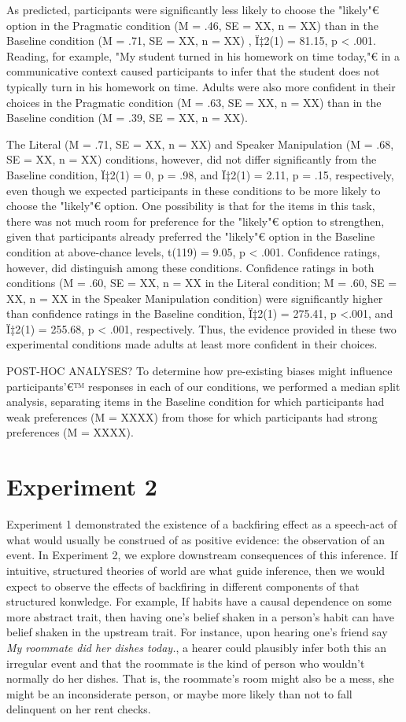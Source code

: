 \documentclass[10pt,letterpaper]{article}
\begin{document}
As predicted, participants were significantly less likely to choose the "likely"€ option in the Pragmatic condition (M = .46, SE = XX, n = XX) than in the Baseline condition (M = .71, SE = XX, n = XX) , Ï‡2(1) = 81.15, p < .001.  Reading, for example, "My student turned in his homework on time today,"€ in a communicative context caused participants to infer that the student does not typically turn in his homework on time.  Adults were also more confident in their choices in the Pragmatic condition (M = .63, SE = XX, n = XX) than in the Baseline condition (M = .39, SE = XX, n = XX).

The Literal (M = .71, SE = XX, n = XX) and Speaker Manipulation (M = .68,  SE = XX, n = XX) conditions, however, did not differ significantly from the Baseline condition, Ï‡2(1) = 0, p = .98, and Ï‡2(1) = 2.11, p = .15, respectively, even though we expected participants in these conditions to be more likely to choose the "likely"€ option.  One possibility is that for the items in this task, there was not much room for preference for the "likely"€ option to strengthen, given that participants already preferred the "likely"€ option in the Baseline condition at above-chance levels, t(119) = 9.05, p < .001.  Confidence ratings, however, did distinguish among these conditions.  Confidence ratings in both conditions (M = .60, SE = XX, n = XX in the Literal condition; M = .60, SE = XX, n = XX in the Speaker Manipulation condition) were significantly higher than confidence ratings in the Baseline condition,  Ï‡2(1) = 275.41, p <.001, and Ï‡2(1) = 255.68, p < .001, respectively.  Thus, the evidence provided in these two experimental conditions made adults at least more confident in their choices.  

POST-HOC ANALYSES?
To determine how pre-existing biases might influence participants'€™ responses in each of our conditions, we performed a median split analysis, separating items in the Baseline condition for which participants had weak preferences (M  = XXXX) from those for which participants had strong preferences (M = XXXX).  


\section{Experiment 2} 
Experiment 1 demonstrated the existence of a backfiring effect as a speech-act of what would usually be construed of as positive evidence: the observation of an event. 
In Experiment 2, we explore downstream consequences of this inference. 
If intuitive, structured theories of world are what guide inference, then we would expect to observe the effects of backfiring in different components of that structured konwledge.
For example, If habits have a causal dependence on some more abstract trait, then having one's belief shaken in a person's habit can have belief shaken in the upstream trait. 
For instance, upon hearing one's friend say \emph{My roommate did her dishes today.}, a hearer could plausibly infer both this an irregular event and that the roommate is the kind of person who wouldn't normally do her dishes. 
That is, the roommate's room might also be a mess, she might be an inconsiderate person, or maybe more likely than not to fall delinquent on her rent checks.
\end{document}
